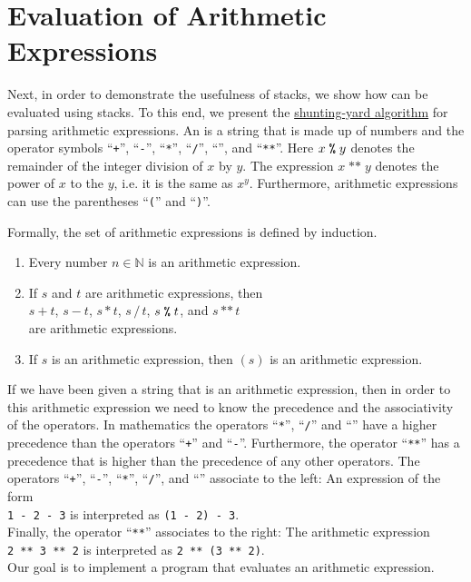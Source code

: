 \section{Evaluation of Arithmetic Expressions}
Next, in order to demonstrate the usefulness of stacks, we show how  can be
evaluated using stacks.  To this end, we present the
\href{https://en.wikipedia.org/wiki/Shunting-yard_algorithm}{shunting-yard algorithm} for
parsing arithmetic expressions.  
An  is a string that is made up of numbers and
the operator symbols ``\texttt{+}'', ``\texttt{-}'', ``\texttt{*}'', ``\texttt{/}'',
``\texttt{}'', and ``\texttt{**}''. Here $x \;\texttt{\symbol{37}}\; y$ denotes the
remainder of the integer division of $x$ by $y$.  The expression $x\;\texttt{**}\;y$ denotes the power of $x$
to the $y$, i.e. it is the same as $x^y$.    Furthermore, arithmetic expressions can use
the parentheses ``\texttt{(}'' and ``\texttt{)}''.
  
Formally, the set of arithmetic expressions is defined by induction.
\begin{enumerate}
\item Every number $n \in \mathbb{N}$ is an arithmetic expression.
\item If $s$ and $t$ are arithmetic expressions, then
      \\[0.2cm]
      \hspace*{1.3cm}
      $s + t$, \quad $s - t$, \quad $s * t$, \quad
      $s \,/\, t$, \quad $s \;\texttt{\symbol{37}}\; t$, \quad and \quad $s \,\texttt{**}\, t$
      \\[0.2cm]
      are arithmetic expressions.
\item If $s$ is an arithmetic expression, then $(s)$ is an arithmetic expression.
\end{enumerate}
If we have been given a string that is an arithmetic expression, then in order to  this
arithmetic expression we need to know the precedence and the associativity of the operators.
In mathematics the operators ``\texttt{*}'', ``\texttt{/}'' and ``\texttt{}'' have a
higher precedence than the operators ``\texttt{+}'' and ``\texttt{-}''.  Furthermore, the operator
  ``\texttt{**}'' has a precedence that is higher than the precedence
 of any other operators.  The operators
``\texttt{+}'', ``\texttt{-}'', ``\texttt{*}'', ``\texttt{/}'', and ``\texttt{}''
associate to the left:  An expression of the form 
\\[0.2cm]
\hspace*{1.3cm} 
\texttt{1 - 2 - 3} \quad is interpreted as \quad \texttt{(1 - 2) - 3}.
 \\[0.2cm]
Finally, the operator ``\texttt{**}'' associates to the right:
The arithmetic expression \\[0.2cm]
\hspace*{1.3cm} 
\texttt{2 \texttt{**} 3 \texttt{**}  2} \quad is interpreted as \quad 
\texttt{2 \texttt{**} (3 \texttt{**} 2)}. 
\\[0.2cm]
Our goal is to implement a program that evaluates an arithmetic expression.


